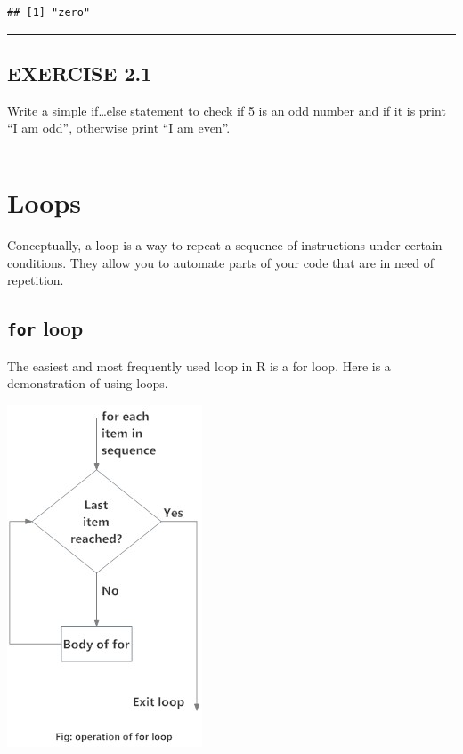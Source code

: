 \documentclass[
]{book}
\begin{document}
\begin{verbatim}
## [1] "zero"
\end{verbatim}

\begin{center}\rule{0.5\linewidth}{0.5pt}\end{center}

\hypertarget{exercise-2.1}{%
\subsection*{EXERCISE 2.1}\label{exercise-2.1}}

Write a simple if\ldots else statement to check if 5 is an odd number and if it is print ``I am odd'', otherwise print ``I am even''.

\begin{center}\rule{0.5\linewidth}{0.5pt}\end{center}

\hypertarget{loops}{%
\section{Loops}\label{loops}}

Conceptually, a loop is a way to repeat a sequence of instructions under certain conditions. They allow you to automate parts of your code that are in need of repetition.

\hypertarget{for-loop}{%
\subsection*{\texorpdfstring{\texttt{for} loop}{for loop}}\label{for-loop}}

The easiest and most frequently used loop in R is a for loop. Here is a demonstration of using loops.

\includegraphics{img/r-for-loop.jpg}
\end{document}
